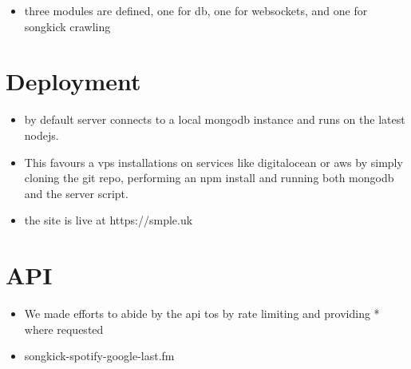 \documentclass[10pt]{article}
\begin{document}
        \begin{itemize}
            \item three modules are defined, one for db, one for websockets, and one for songkick crawling
        \end{itemize}

    \section{Deployment}
        \begin{itemize}
            \item by default server connects to a local mongodb instance and runs on the latest nodejs.
            \item This favours a vps installations on services like digitalocean or aws by simply cloning the git repo, performing an npm install and running both mongodb and the server script.
            \item the site is live at https://smple.uk
        \end{itemize}

    \section{API}
        \begin{itemize}
            \item We made efforts to abide by the api tos by rate limiting and providing * where requested
            \item songkick-spotify-google-last.fm
        \end{itemize}





\end{document}
